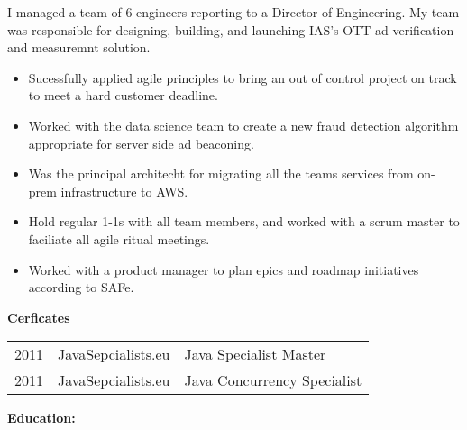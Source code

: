 \documentclass[12t]{article}
\begin{document}
\vspace{3pt} I managed a team of 6 engineers reporting to a Director of Engineering. My team was responsible for designing, building, and
launching IAS's OTT ad-verification and measuremnt solution. 
\begin{multicols}{2}
  \begin{small}
    \begin{itemize}[leftmargin=*,label=\tiny{$\bullet$}]
    \item\begin{minipage}[t]{\linewidth}{Sucessfully applied agile principles to bring an out of control project on track to meet a hard customer deadline.}\end{minipage}
    \item\begin{minipage}[t]{\linewidth}{Worked with the data science team to create a new fraud detection algorithm appropriate for server side ad beaconing.}\end{minipage}
    \item\begin{minipage}[t]{\linewidth}{Was the principal architecht for migrating all the teams services from on-prem infrastructure to AWS.}\end{minipage}
    \item\begin{minipage}[t]{\linewidth}{Hold regular 1-1s with all team members, and worked with a scrum master to faciliate all agile ritual meetings.}\end{minipage}
    \item\begin{minipage}[t]{\linewidth}{Worked with a product manager to plan epics and roadmap initiatives according to SAFe.}\end{minipage}
    \end{itemize}
  \end{small} 
\end{multicols}

\vspace{10pt}\textbf{Cerficates}

\vspace{3pt}\begin{tabular}{lll}
  2011 & JavaSepcialists.eu & Java Specialist Master\\
  2011 & JavaSepcialists.eu & Java Concurrency Specialist
\end{tabular}

\vspace{10pt}\textbf{Education:}
\end{document}
